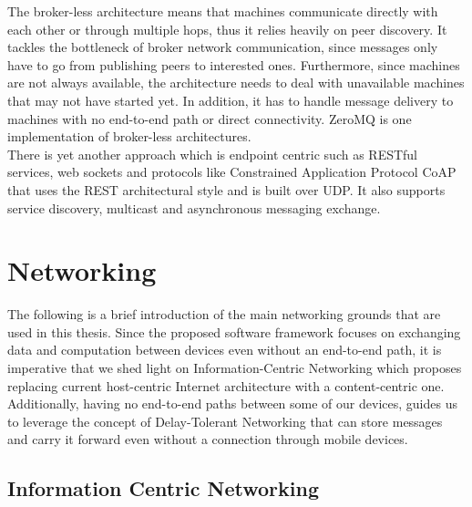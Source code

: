 \noindent The broker-less architecture means that machines communicate directly with each other or through multiple hops, thus it relies heavily on peer discovery. It tackles the bottleneck of broker network communication, since messages only have to go from publishing peers to interested ones.  Furthermore, since machines are not always available, the architecture needs to deal with unavailable machines that may not have started yet. In addition, it has to handle message delivery to machines with no end-to-end path or direct connectivity. ZeroMQ \cite{zeromq} is one implementation of broker-less architectures. \\


\noindent There is yet another approach which is endpoint centric such as RESTful services, web sockets and protocols like Constrained Application Protocol CoAP \cite{coAP} that uses the REST architectural style and is built over UDP. It also supports service discovery, multicast and asynchronous messaging exchange. 

\section{Networking}

The following is a brief introduction of the main networking grounds that are used in this thesis. Since the  proposed software framework focuses on exchanging data and computation between devices even without an end-to-end path, it is imperative that we shed light on Information-Centric Networking which proposes replacing current host-centric  Internet architecture  with a content-centric one. Additionally,  having no end-to-end paths between some  of our devices, guides us to leverage the concept of Delay-Tolerant Networking that can store messages and carry it forward even without a connection through mobile devices.
\subsection{Information Centric Networking}

